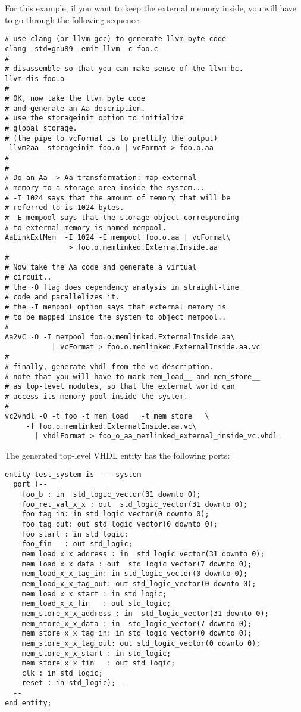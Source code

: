 \documentclass{article}
\begin{document}
For this example, if you want to keep the external memory
inside, you will have to go through the following sequence
\begin{verbatim}
# use clang (or llvm-gcc) to generate llvm-byte-code
clang -std=gnu89 -emit-llvm -c foo.c
#
# disassemble so that you can make sense of the llvm bc.
llvm-dis foo.o
#
# OK, now take the llvm byte code
# and generate an Aa description.
# use the storageinit option to initialize
# global storage.
# (the pipe to vcFormat is to prettify the output)
 llvm2aa -storageinit foo.o | vcFormat > foo.o.aa
#
#
# Do an Aa -> Aa transformation: map external
# memory to a storage area inside the system...
# -I 1024 says that the amount of memory that will be
# referred to is 1024 bytes.
# -E mempool says that the storage object corresponding
# to external memory is named mempool.
AaLinkExtMem  -I 1024 -E mempool foo.o.aa | vcFormat\
               > foo.o.memlinked.ExternalInside.aa
#
# Now take the Aa code and generate a virtual
# circuit..
# the -O flag does dependency analysis in straight-line
# code and parallelizes it.
# the -I mempool option says that external memory is
# to be mapped inside the system to object mempool..
#
Aa2VC -O -I mempool foo.o.memlinked.ExternalInside.aa\
           | vcFormat > foo.o.memlinked.ExternalInside.aa.vc
#
# finally, generate vhdl from the vc description.
# note that you will have to mark mem_load__ and mem_store__
# as top-level modules, so that the external world can
# access its memory pool inside the system.
#
vc2vhdl -O -t foo -t mem_load__ -t mem_store__ \ 
     -f foo.o.memlinked.ExternalInside.aa.vc\
       | vhdlFormat > foo_o_aa_memlinked_external_inside_vc.vhdl
\end{verbatim}

The generated top-level VHDL entity has the following
ports:
\begin{verbatim}
entity test_system is  -- system
  port (--
    foo_b : in  std_logic_vector(31 downto 0);
    foo_ret_val_x_x : out  std_logic_vector(31 downto 0);
    foo_tag_in: in std_logic_vector(0 downto 0);
    foo_tag_out: out std_logic_vector(0 downto 0);
    foo_start : in std_logic;
    foo_fin   : out std_logic;
    mem_load_x_x_address : in  std_logic_vector(31 downto 0);
    mem_load_x_x_data : out  std_logic_vector(7 downto 0);
    mem_load_x_x_tag_in: in std_logic_vector(0 downto 0);
    mem_load_x_x_tag_out: out std_logic_vector(0 downto 0);
    mem_load_x_x_start : in std_logic;
    mem_load_x_x_fin   : out std_logic;
    mem_store_x_x_address : in  std_logic_vector(31 downto 0);
    mem_store_x_x_data : in  std_logic_vector(7 downto 0);
    mem_store_x_x_tag_in: in std_logic_vector(0 downto 0);
    mem_store_x_x_tag_out: out std_logic_vector(0 downto 0);
    mem_store_x_x_start : in std_logic;
    mem_store_x_x_fin   : out std_logic;
    clk : in std_logic;
    reset : in std_logic); --
  --
end entity;
\end{verbatim}
\end{document}
